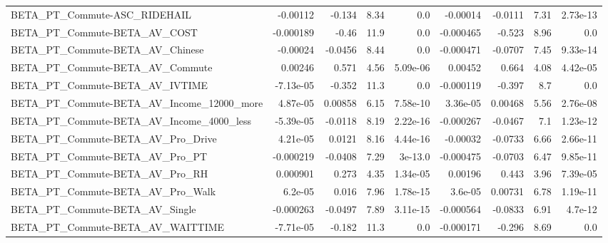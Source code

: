 \begin{tabular}{lrrrrrrrr}
BETA\_PT\_Commute-ASC\_RIDEHAIL                       &    -0.00112 &       -0.134 &      8.34 &      0.0 &   -0.00014 &     -0.0111 &         7.31 &      2.73e-13 \\
BETA\_PT\_Commute-BETA\_AV\_COST                       &   -0.000189 &        -0.46 &      11.9 &      0.0 &  -0.000465 &      -0.523 &         8.96 &           0.0 \\
BETA\_PT\_Commute-BETA\_AV\_Chinese                    &    -0.00024 &      -0.0456 &      8.44 &      0.0 &  -0.000471 &     -0.0707 &         7.45 &      9.33e-14 \\
BETA\_PT\_Commute-BETA\_AV\_Commute                    &     0.00246 &        0.571 &      4.56 & 5.09e-06 &    0.00452 &       0.664 &         4.08 &      4.42e-05 \\
BETA\_PT\_Commute-BETA\_AV\_IVTIME                     &   -7.13e-05 &       -0.352 &      11.3 &      0.0 &  -0.000119 &      -0.397 &          8.7 &           0.0 \\
BETA\_PT\_Commute-BETA\_AV\_Income\_12000\_more          &    4.87e-05 &      0.00858 &      6.15 & 7.58e-10 &   3.36e-05 &     0.00468 &         5.56 &      2.76e-08 \\
BETA\_PT\_Commute-BETA\_AV\_Income\_4000\_less           &   -5.39e-05 &      -0.0118 &      8.19 & 2.22e-16 &  -0.000267 &     -0.0467 &          7.1 &      1.23e-12 \\
BETA\_PT\_Commute-BETA\_AV\_Pro\_Drive                  &    4.21e-05 &       0.0121 &      8.16 & 4.44e-16 &   -0.00032 &     -0.0733 &         6.66 &      2.66e-11 \\
BETA\_PT\_Commute-BETA\_AV\_Pro\_PT                     &   -0.000219 &      -0.0408 &      7.29 &  3e-13.0 &  -0.000475 &     -0.0703 &         6.47 &      9.85e-11 \\
BETA\_PT\_Commute-BETA\_AV\_Pro\_RH                     &    0.000901 &        0.273 &      4.35 & 1.34e-05 &    0.00196 &       0.443 &         3.96 &      7.39e-05 \\
BETA\_PT\_Commute-BETA\_AV\_Pro\_Walk                   &     6.2e-05 &        0.016 &      7.96 & 1.78e-15 &    3.6e-05 &     0.00731 &         6.78 &      1.19e-11 \\
BETA\_PT\_Commute-BETA\_AV\_Single                     &   -0.000263 &      -0.0497 &      7.89 & 3.11e-15 &  -0.000564 &     -0.0833 &         6.91 &       4.7e-12 \\
BETA\_PT\_Commute-BETA\_AV\_WAITTIME                   &   -7.71e-05 &       -0.182 &      11.3 &      0.0 &  -0.000171 &      -0.296 &         8.69 &           0.0 \\

\end{tabular}
